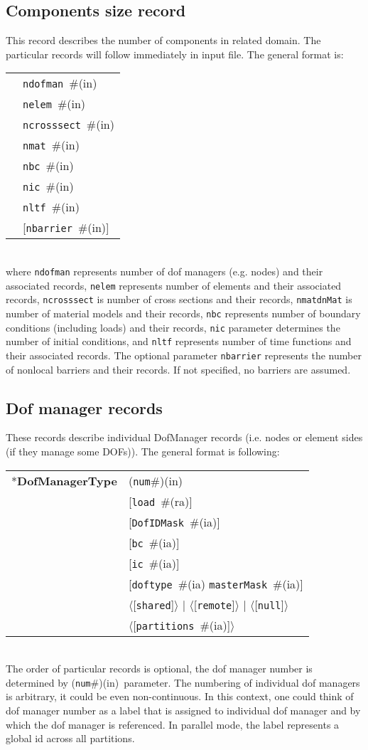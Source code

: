 \documentclass[a4paper]{article}
\makeatletter
\newcommand{\param}[1]{\texttt{#1}} %
\newcommand{\optional}[1]{[#1]} %
\newcommand{\field}[2]{\param{#1}~\#{\tiny(#2)}} %
\newcommand{\optField}[2]{\optional{\field{#1}{#2}}}
\newcommand{\optFieldnotype}[1]{[\param{#1}]}
\newcommand{\componentNum}{(\param{num}\#){\tiny(in)}} %
\newcommand{\entKeyword}[1]{*\textbf{#1}} %
\newcommand{\Pmode}[1]{{\sffamily #1}}
\newcommand{\oofemParallel}[1]{$\langle${#1}$\rangle$}
\newcommand{\PoptField}[2]{\oofemParallel{\optField{#1}{#2}}}
\newcommand{\PoptFieldnotype}[1]{\oofemParallel{\optFieldnotype{#1}}}
\newenvironment{record}[1][]{\begin{tabular}{|ll}}{\end{tabular}\\}
\newcommand{\recentry}[2]{{#1}&{#2}\\}
\newcounter{rcc}
\newenvironment{record}[1][\textwidth]{\setcounter{rcc}{0}\begin{tabular*}{#1}{|ll@{\extracolsep{\fill}}r}}{\end{tabular*}\\}
\newcommand{\recentry}[2]{\ifthenelse{\value{rcc}>0}{&$\backslash$ \\}{\setcounter{rcc}{1}}{#1}&{#2}}
\makeatother
\begin{document}
\subsection{Components size record}
\label{_ComponentsSizeRecord}
This record describes the number of components in related domain. The
particular records will follow immediately in input file. The general format is:\\
\begin{record}
  \recentry{}{\field{ndofman}{in}}
  \recentry{}{\field{nelem}{in}}
  \recentry{}{\field{ncrosssect}{in}}
  \recentry{}{\field{nmat}{in}}
  \recentry{}{\field{nbc}{in}}
  \recentry{}{\field{nic}{in}}
  \recentry{}{\field{nltf}{in}}
  \recentry{}{\optField{nbarrier}{in}}
\end{record}
where \param{ndofman} represents number of dof managers (e.g. nodes) and their associated records,
\param{nelem} represents number of elements and their associated records, \param{ncrosssect} is
number of cross sections and their records, \param{nmatdnMat}{} is number of material
models and their records, \param{nbc}{} represents number of boundary
conditions (including loads) and their
records, \param{nic} parameter determines the number of initial
conditions, and \param{nltf} represents number of time functions and
their associated records. The optional parameter \param{nbarrier}
represents the number of nonlocal barriers and their records. If not
specified, no barriers are assumed.

\subsection{Dof manager records}
\label{_NodeElementSideRecords}
These records describe individual DofManager records (i.e. nodes or element sides (if they manage some DOFs)). The general format is following:

\noindent
\begin{record}
  \recentry{\entKeyword{DofManagerType}}{\componentNum}
  \recentry{}{[\field{load}{ra}]}
  \recentry{}{[\field{DofIDMask}{ia}]}
  \recentry{}{\optField{bc}{ia}}
  \recentry{}{\optField{ic}{ia}}
  \recentry{}{[\field{doftype}{ia} \field{masterMask}{ia}]}
  \recentry{}{\PoptFieldnotype{shared} $|$ \PoptFieldnotype{remote} $|$ \PoptFieldnotype{null}}
  \recentry{}{\PoptField{partitions}{ia}}
\end{record}
The order of particular records is optional, the dof manager number is determined by \componentNum\ parameter.
The numbering of individual dof managers is arbitrary, it could be even non-continuous. In this context, one could think of dof manager number as a label that is assigned to individual dof manager and by which the dof manager is referenced.
\Pmode{In parallel mode, the label represents a global id across all partitions.}
\end{document}
